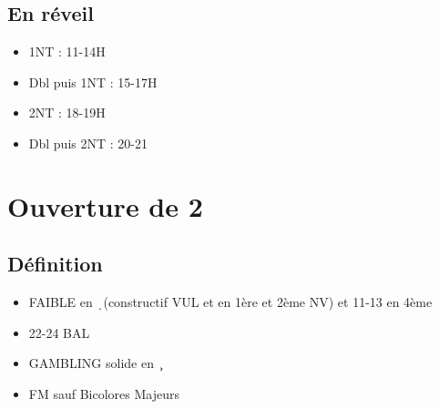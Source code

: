 \documentclass[a4paper]{article}
\begin{document}
\subsection{En réveil}

\begin{itemize}
\item 1NT : 11-14H

\item Dbl puis 1NT : 15-17H

\item 2NT : 18-19H

\item Dbl puis 2NT : 20-21

\end{itemize}

\section{Ouverture de 2\pdfc}

\subsection{Définition}

\begin{itemize}
\item FAIBLE en \d\ (constructif VUL et en 1ère et 2ème NV) et 11-13 en 4ème

\item 22-24 BAL

\item GAMBLING solide en \c\ 

\item FM sauf Bicolores Majeurs

\end{itemize}
\end{document}

